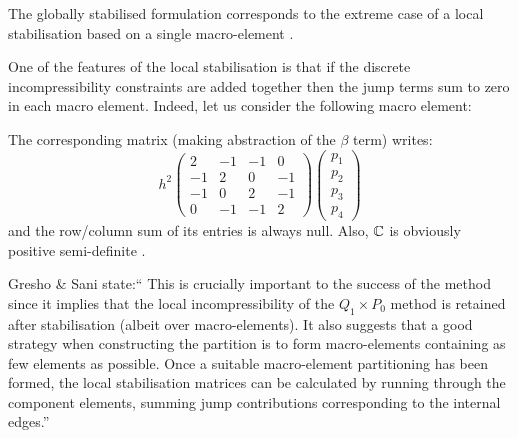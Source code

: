 \begin{remark}
The globally stabilised formulation corresponds to the
extreme case of a local stabilisation based on a single macro-element \cite{grsa}.
\end{remark}

One of the features of the local stabilisation is that if the discrete incompressibility constraints are added together then the jump terms sum to zero in each macro element.
Indeed, let us consider the following macro element:

\begin{center}

\end{center}

The corresponding matrix (making abstraction of the $\beta$ term) writes:
\[
h^2
\left(
\begin{array}{cccc}
2 & -1 & -1 &0 \\
-1 & 2 & 0 & -1 \\
-1 & 0 & 2 & -1 \\
0 & -1 & -1 & 2
\end{array}
\right)
\left(
\begin{array}{c}
p_1 \\ p_2 \\ p_3 \\ p_4
\end{array}
\right)
\]
and the row/column sum of its entries is always null. Also, 
${\mathbb{C}}$ is obviously positive semi-definite \cite{sike90}.

Gresho \& Sani \cite{grsa} state:``
This is crucially important to the success of the method since it implies that the local incompressibility of the $Q_1\times P_0$ method is retained after stabilisation (albeit over macro-elements).
It also suggests that a good strategy when constructing the partition
is to form macro-elements containing as few elements as possible.
Once a suitable macro-element partitioning has been formed, the local stabilisation matrices can be calculated by running through the component elements, summing jump contributions corresponding to the internal edges.''

